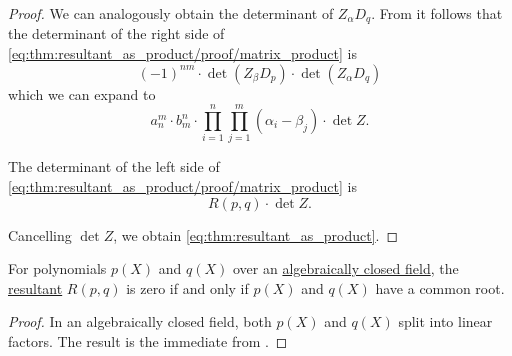 \begin{proof}
  We can analogously obtain the determinant of \( Z_\alpha D_q \). From  it follows that the determinant of the right side of \eqref{eq:thm:resultant_as_product/proof/matrix_product} is
  \begin{equation*}
    (-1)^{nm} \cdot \det(Z_\beta D_p) \cdot \det(Z_\alpha D_q)
  \end{equation*}
  which we can expand to
  \begin{equation*}
    a_n^m \cdot b_m^n \cdot \prod_{i=1}^n \prod_{j=1}^m (\alpha_i - \beta_j) \cdot \det Z.
  \end{equation*}

  The determinant of the left side of \eqref{eq:thm:resultant_as_product/proof/matrix_product} is
  \begin{equation*}
    R(p, q) \cdot \det Z.
  \end{equation*}

  Cancelling \( \det Z \), we obtain \eqref{eq:thm:resultant_as_product}.
\end{proof}

\begin{corollary}\label{thm:resultant_invertibility}
  For polynomials \( p(X) \) and \( q(X) \) over an \hyperref[def:algebraically_closed_field]{algebraically closed field}, the \hyperref[def:resultant]{resultant} \( R(p, q) \) is zero if and only if \( p(X) \) and \( q(X) \) have a common root.
\end{corollary}
\begin{proof}
  In an algebraically closed field, both \( p(X) \) and \( q(X) \) split into linear factors. The result is the immediate from .
\end{proof}

